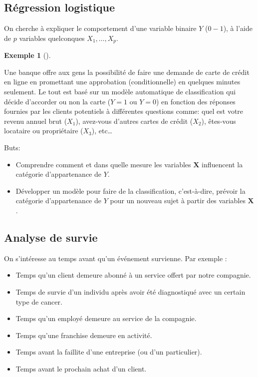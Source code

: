 \documentclass[
  11pt,
  letterpaper,
]{scrbook}
\providecommand{\tightlist}{%
  \setlength{\itemsep}{0pt}\setlength{\parskip}{0pt}}\usepackage{longtable,booktabs,array}
\theoremstyle{definition}
\newtheorem{example}{Exemple}[chapter]
\theoremstyle{remark}
\begin{document}
\subsection{Régression logistique}\label{ruxe9gression-logistique}

On cherche à expliquer le comportement d'une variable binaire \(Y\)
(\(0-1\)), à l'aide de \(p\) variables quelconques \(X_1, \ldots, X_p\).

\begin{example}[]\protect\hypertarget{exm-logistique}{}\label{exm-logistique}

Une banque offre aux gens la possibilité de faire une demande de carte
de crédit en ligne en promettant une approbation (conditionnelle) en
quelques minutes seulement. Le tout est basé sur un modèle automatique
de classification qui décide d'accorder ou non la carte (\(Y=1\) ou
\(Y=0\)) en fonction des réponses fournies par les clients potentiels à
différentes questions comme: quel est votre revenu annuel brut
(\(X_1\)), avez-vous d'autres cartes de crédit (\(X_2\)), êtes-vous
locataire ou propriétaire (\(X_3\)), etc\ldots

\end{example}

Buts:

\begin{itemize}
\tightlist
\item
  Comprendre comment et dans quelle mesure les variables
  \(\boldsymbol{X}\) influencent la catégorie d'appartenance de \(Y\).
\item
  Développer un modèle pour faire de la classification, c'est-à-dire,
  prévoir la catégorie d'appartenance de \(Y\) pour un nouveau sujet à
  partir des variables \(\boldsymbol{X}\).
\end{itemize}

\subsection{Analyse de survie}\label{analyse-de-survie}

On s'intéresse au temps avant qu'un événement survienne. Par exemple :

\begin{itemize}
\tightlist
\item
  Temps qu'un client demeure abonné à un service offert par notre
  compagnie.
\item
  Temps de survie d'un individu après avoir été diagnostiqué avec un
  certain type de cancer.
\item
  Temps qu'un employé demeure au service de la compagnie.
\item
  Temps qu'une franchise demeure en activité.
\item
  Temps avant la faillite d'une entreprise (ou d'un particulier).
\item
  Temps avant le prochain achat d'un client.
\end{itemize}
\end{document}
